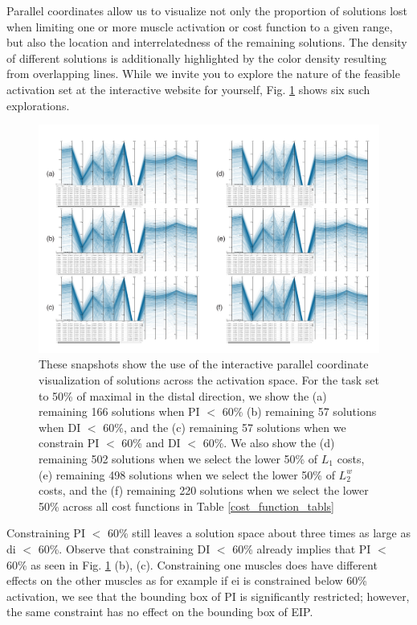 Parallel coordinates allow us to visualize not only the proportion of solutions lost when limiting one or more muscle activation or cost function to a given range, but also the location and interrelatedness of the remaining solutions. The density of different solutions is additionally highlighted by the color density resulting from  overlapping  lines. While we invite you to explore the nature of the feasible activation set at the interactive website for yourself, Fig. \ref{fig:parcoords} shows six such explorations.

\begin{figure}[htbp]
\centering
\includegraphics[width=\textwidth]{figs/parcoords.pdf}
\caption{These snapshots show the use of the interactive parallel coordinate visualization of solutions across the activation space. For the task set to 50\% of maximal in the distal direction, we show the
(a) remaining 166 solutions when PI $<$ 60\% 
(b) remaining 57 solutions when DI $<$ 60\%, and the
(c) remaining 57 solutions when we constrain PI $<$ 60\% and DI $<$ 60\%. We also show the
(d) remaining 502 solutions when we select the lower 50\% of $L_1$ costs,
(e) remaining 498 solutions when we select the lower 50\% of $L_2^w$ costs, and the
(f) remaining 220 solutions when we select the lower 50\% across all cost functions in Table \ref{cost_function_tabls} }
\label{fig:parcoords}
\end{figure}

Constraining PI $<$ 60\% still leaves a solution space about three times as large as di $<$ 60\%. 
Observe that constraining DI $<$ 60\% already implies that PI $<$ 60\% as seen in Fig. \ref{fig:parcoords} (b), (c). 
Constraining one muscles does have different effects on the other muscles as for example if ei is constrained below 60\% activation, we see that the bounding box of PI is significantly restricted; however, the same constraint has no effect on the bounding box of EIP.

